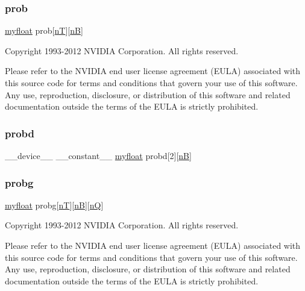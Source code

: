 \subsubsection{\texorpdfstring{prob}{prob}}
{\footnotesize\ttfamily \hyperlink{param_8h_a5f097c9f3873af7be7fc156e6a06ca5e}{myfloat} prob\mbox{[}\hyperlink{NarrowBand_8h_a11e43991170d325cb21737c8e7d5acaa}{nT}\mbox{]}\mbox{[}\hyperlink{NarrowBand_8h_aca13f491975ccaa9a165708a85753bda}{nB}\mbox{]}}

Copyright 1993-\/2012 N\+V\+I\+D\+IA Corporation. All rights reserved.

Please refer to the N\+V\+I\+D\+IA end user license agreement (E\+U\+LA) associated with this source code for terms and conditions that govern your use of this software. Any use, reproduction, disclosure, or distribution of this software and related documentation outside the terms of the E\+U\+LA is strictly prohibited. \mbox{\label{mc__gpu_8cu_a131af82a244f87ed47b51923130d1dd8}} 
\subsubsection{\texorpdfstring{probd}{probd}}
{\footnotesize\ttfamily \+\_\+\+\_\+device\+\_\+\+\_\+ \+\_\+\+\_\+constant\+\_\+\+\_\+ \hyperlink{param_8h_a5f097c9f3873af7be7fc156e6a06ca5e}{myfloat} probd\mbox{[}2\mbox{]}\mbox{[}\hyperlink{NarrowBand_8h_aca13f491975ccaa9a165708a85753bda}{nB}\mbox{]}}

\mbox{\label{mc__gpu_8cu_a154b4ee2e5ccbfa05ff4d8df0337f5a3}} 
\subsubsection{\texorpdfstring{probg}{probg}}
{\footnotesize\ttfamily \hyperlink{param_8h_a5f097c9f3873af7be7fc156e6a06ca5e}{myfloat} probg\mbox{[}\hyperlink{NarrowBand_8h_a11e43991170d325cb21737c8e7d5acaa}{nT}\mbox{]}\mbox{[}\hyperlink{NarrowBand_8h_aca13f491975ccaa9a165708a85753bda}{nB}\mbox{]}\mbox{[}\hyperlink{NarrowBand_8h_ac207cb86a4c7e5bc1973837ee2339e59}{nQ}\mbox{]}}

Copyright 1993-\/2012 N\+V\+I\+D\+IA Corporation. All rights reserved.

Please refer to the N\+V\+I\+D\+IA end user license agreement (E\+U\+LA) associated with this source code for terms and conditions that govern your use of this software. Any use, reproduction, disclosure, or distribution of this software and related documentation outside the terms of the E\+U\+LA is strictly prohibited. \mbox{\label{mc__gpu_8cu_a83c1d7ca537eb5fb4a345d9fb2efa881}} 
